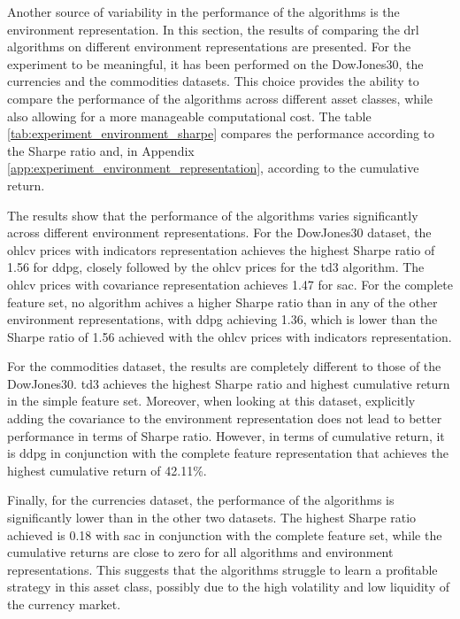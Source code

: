 Another source of variability in the performance of the algorithms is the environment representation. In this section, the results of comparing the \acrshort{drl} algorithms on different environment representations are presented. For the experiment to be meaningful, it has been performed on the DowJones30, the currencies and the commodities datasets. This choice provides the ability to compare the performance of the algorithms across different asset classes, while also allowing for a more manageable computational cost. The table \ref{tab:experiment_environment_sharpe} compares the performance according to the Sharpe ratio and, in Appendix \ref{app:experiment_environment_representation}, according to the cumulative return.



The results show that the performance of the algorithms varies significantly across different environment representations. For the DowJones30 dataset, the \acrshort{ohlcv} prices with indicators representation achieves the highest Sharpe ratio of 1.56 for \acrshort{ddpg}, closely followed by the \acrshort{ohlcv} prices for the \acrshort{td3} algorithm. The \acrshort{ohlcv} prices with covariance representation achieves 1.47 for \acrshort{sac}. For the complete feature set, no algorithm achives a higher Sharpe ratio than in any of the other environment representations, with \acrshort{ddpg} achieving 1.36, which is lower than the Sharpe ratio of 1.56 achieved with the \acrshort{ohlcv} prices with indicators representation.

For the commodities dataset, the results are completely different to those of the DowJones30. \acrshort{td3} achieves the highest Sharpe ratio and highest cumulative return in the simple feature set. Moreover, when looking at this dataset, explicitly adding the covariance to the environment representation does not lead to better performance in terms of Sharpe ratio. However, in terms of cumulative return, it is \acrshort{ddpg} in conjunction with the complete feature representation that achieves the highest cumulative return of 42.11\%. 

Finally, for the currencies dataset, the performance of the algorithms is significantly lower than in the other two datasets. The highest Sharpe ratio achieved is 0.18 with \acrshort{sac} in conjunction with the complete feature set, while the cumulative returns are close to zero for all algorithms and environment representations. This suggests that the algorithms struggle to learn a profitable strategy in this asset class, possibly due to the high volatility and low liquidity of the currency market.

